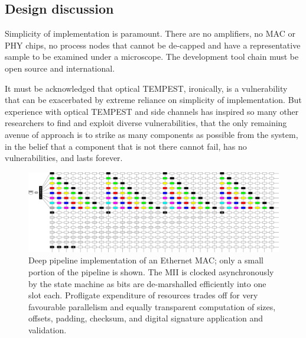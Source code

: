 \documentclass[conference]{IEEEtran}
\begin{document}
\subsection{Design discussion}

Simplicity of implementation is paramount. There are no amplifiers, no MAC
or PHY chips, no process nodes that cannot be de-capped and have a
representative sample to be examined under a microscope. The development tool
chain must be open source and international.

It must be acknowledged that optical TEMPEST, ironically, is a vulnerability
that can be exacerbated by extreme reliance on simplicity of implementation.
But experience with optical TEMPEST and side channels has inspired so many
other researchers to find and exploit diverse vulnerabilities, that the only
remaining avenue of approach is to strike as many components as possible from
the system, in the belief that a component that is not there cannot fail, has
no vulnerabilities, and lasts forever.

\begin{figure}[!t]
    \centering
	\includegraphics[width=\textwidth]{graphics/deep_pipeline.png}
	\caption{Deep pipeline implementation of an Ethernet MAC; only a small
        portion of the pipeline is shown. The MII is clocked asynchronously
        by the state machine as bits are de-marshalled efficiently into one
        slot each. Profligate expenditure of resources trades off for very
        favourable parallelism and equally transparent computation of sizes,
        offsets, padding, checksum, and digital signature application and
        validation.}
	\label{figure:deep_pipeline}
\end{figure}

\end{document}
